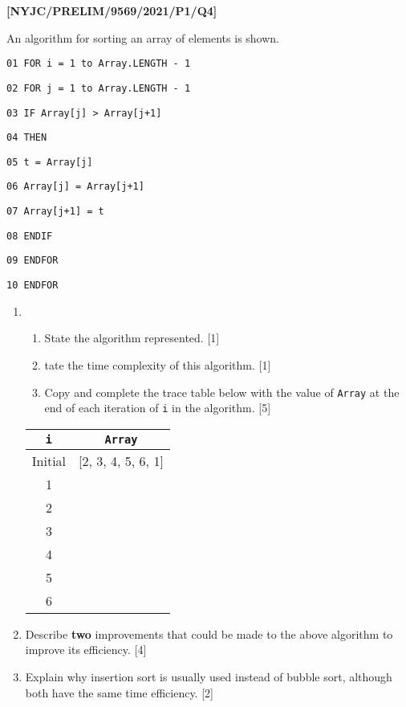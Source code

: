 \item \textbf{{[}NYJC/PRELIM/9569/2021/P1/Q4{]} }

An algorithm for sorting an array of elements is shown. 

\noindent %
\noindent\begin{minipage}[t]{1\columnwidth}%
\texttt{01 FOR i = 1 to Array.LENGTH - 1 }

\texttt{02 \qquad{}FOR j = 1 to Array.LENGTH - 1 }

\texttt{03 \qquad{}\qquad{}IF Array{[}j{]} > Array{[}j+1{]} }

\texttt{04 \qquad{}\qquad{}\qquad{}THEN }

\texttt{05 \qquad{}\qquad{}\qquad{}\qquad{}t = Array{[}j{]} }

\texttt{06 \qquad{}\qquad{}\qquad{}\qquad{}Array{[}j{]} = Array{[}j+1{]} }

\texttt{07 \qquad{}\qquad{}\qquad{}\qquad{}Array{[}j+1{]} = t }

\texttt{08 \qquad{}\qquad{}ENDIF }

\texttt{09 \qquad{}ENDFOR }

\texttt{10 ENDFOR }%
\end{minipage}
\begin{enumerate}
\item {} 
\begin{enumerate}
\item State the algorithm represented. \hfill{}{[}1{]}
\item tate the time complexity of this algorithm. \hfill{}{[}1{]}
\item Copy and complete the trace table below with the value of \texttt{Array}
at the end of each iteration of \texttt{i} in the algorithm. \hfill{}{[}5{]}
\end{enumerate}
\noindent \begin{center}
\begin{tabular}{|c|c|}
\hline 
\texttt{i} & \texttt{Array}\tabularnewline
\hline 
Initial  & {[}2, 3, 4, 5, 6, 1{]}\tabularnewline
\hline 
1 & \tabularnewline
\hline 
2 & \tabularnewline
\hline 
3 & \tabularnewline
\hline 
4 & \tabularnewline
\hline 
5 & \tabularnewline
\hline 
6 & \tabularnewline
\hline 
\end{tabular}
\par\end{center}
\item Describe \textbf{two} improvements that could be made to the above
algorithm to improve its efficiency. \hfill{}{[}4{]}
\item Explain why insertion sort is usually used instead of bubble sort,
although both have the same time efficiency.\hfill{} {[}2{]}
\end{enumerate}